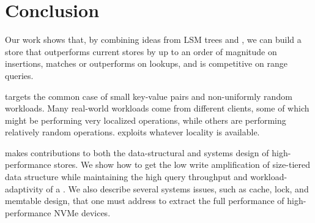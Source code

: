 \section{Conclusion}
\label{sec:conclusion}

Our work shows that, by combining ideas from LSM trees and \bets, we can build
a \kv store that outperforms current \kv stores by up to an order of magnitude
on insertions, matches or outperforms on lookups, and is competitive on range
queries.

\Sysname targets the common case of small key-value pairs and
non-uniformly random workloads.  Many real-world \kv workloads come
from different clients, some of which might be performing very
localized operations, while others are performing relatively random
operations.  \Sysname exploits whatever locality is available.

\Sysname makes contributions to both the data-structural and systems
design of high-performance \kv stores.  We show how to get the low
write amplification of size-tiered data structure while maintaining
the high query throughput and workload-adaptivity of a \bet.  We also
describe several systems issues, such as cache, lock, and memtable
design, that one must address to extract the full performance of
high-performance NVMe devices.
